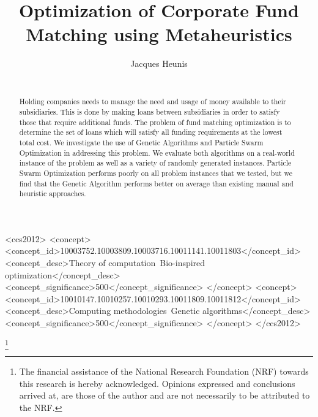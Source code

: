 \documentclass{sig-alternate}
\begin{document}
%
\title{Optimization of Corporate Fund Matching using Metaheuristics}

\author{
\alignauthor
Jacques Heunis\\
       \\
}
\maketitle

%
%
\begin{CCSXML}
<ccs2012>
<concept>
<concept_id>10003752.10003809.10003716.10011141.10011803</concept_id>
<concept_desc>Theory of computation~Bio-inspired optimization</concept_desc>
<concept_significance>500</concept_significance>
</concept>
<concept>
<concept_id>10010147.10010257.10010293.10011809.10011812</concept_id>
<concept_desc>Computing methodologies~Genetic algorithms</concept_desc>
<concept_significance>500</concept_significance>
</concept>
</ccs2012>
\end{CCSXML}


\printccsdesc
\let\svthefootnote\thefootnote
\let\thefootnote\relax\footnote{The financial assistance of the National Research Foundation (NRF) towards this research is hereby acknowledged. Opinions expressed and conclusions arrived at, are those of the author and are not necessarily to be attributed to the NRF.}
\addtocounter{footnote}{-1}\let\thefootnote\svthefootnote

\begin{abstract}
Holding companies needs to manage the need and usage of money available to their subsidiaries. This is done by making loans between subsidiaries in order to satisfy those that require additional funds. The problem of fund matching optimization is to determine the set of loans which will satisfy all funding requirements at the lowest total cost. We investigate the use of Genetic Algorithms and Particle Swarm Optimization in addressing this problem. We evaluate both algorithms on a real-world instance of the problem as well as a variety of randomly generated instances. Particle Swarm Optimization performs poorly on all problem instances that we tested, but we find that the Genetic Algorithm performs better on average than existing manual and heuristic approaches.
\end{abstract}
\end{document}
